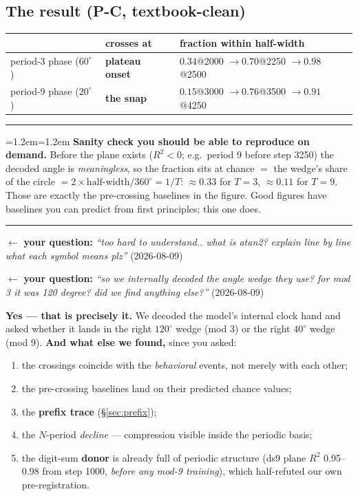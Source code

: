 \documentclass[11pt]{article}
\newcommand{\yourq}[2]{%
  \par\vspace{4pt}\noindent
  \textcolor{qcol}{$\leftarrow$ \textbf{your question:}
  \textit{``#1''}\; \textnormal{(#2)}}\par\vspace{4pt}}
\newenvironment{keybox}
  {\par\vspace{7pt}\noindent\hrule\vspace{5pt}%
   \begingroup\leftskip=1.2em\rightskip=1.2em\noindent\ignorespaces}
  {\par\endgroup\vspace{5pt}\hrule\vspace{7pt}}
\begin{document}
\subsection*{The result (P-C, textbook-clean)}

\begin{center}
\begin{tabular}{@{}lll@{}}
\toprule
& \textbf{crosses at} & \textbf{fraction within half-width} \\
\midrule
period-3 phase ($60^\circ$) & \textbf{plateau onset} &
  $0.34$@2000 $\to 0.70$@2250 $\to \mathbf{0.98}$@2500 \\
period-9 phase ($20^\circ$) & \textbf{the snap} &
  $0.15$@3000 $\to 0.76$@3500 $\to \mathbf{0.91}$@4250 \\
\bottomrule
\end{tabular}
\end{center}

\begin{keybox}
\textbf{Sanity check you should be able to reproduce on demand.} Before the plane
exists ($R^2 < 0$; e.g.\ period 9 before step 3250) the decoded angle is
\emph{meaningless}, so the fraction sits at chance $=$ the wedge's share of the
circle $= 2\times\text{half-width}/360^\circ = 1/T$:
$\approx 0.33$ for $T{=}3$, $\approx 0.11$ for $T{=}9$. Those are exactly the
pre-crossing baselines in the figure. Good figures have baselines you can predict
from first principles; this one does.
\end{keybox}

\yourq{too hard to understand.. what is atan2? explain line by line what each
symbol means plz}{2026-08-09}
\yourq{so we internally decoded the angle wedge they use? for mod 3 it was 120
degree? did we find anything else?}{2026-08-09}

\noindent\textbf{Yes --- that is precisely it.} We decoded the model's internal
clock hand and asked whether it lands in the right $120^\circ$ wedge (mod 3) or
the right $40^\circ$ wedge (mod 9). \textbf{And what else we found,} since you
asked:
\begin{enumerate}[label=(\alph*),leftmargin=*,itemsep=1pt]
\item the crossings coincide with the \emph{behavioral} events, not merely with each other;
\item the pre-crossing baselines land on their predicted chance values;
\item the \textbf{prefix trace} (\S\ref{sec:prefix});
\item the $N$-period \emph{decline} --- compression visible inside the periodic basis;
\item the digit-sum \textbf{donor} is already full of periodic structure (ds9 plane
$R^2$ 0.95--0.98 from step 1000, \emph{before any mod-9 training}), which
half-refuted our own pre-registration.
\end{enumerate}
\end{document}

